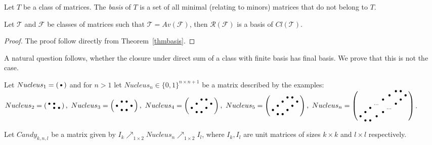 \begin{defn}
Let $T$ be a class of matrices. The \emph{basis} of $T$ is a set of all minimal (relating to minors) matrices that do not belong to $T$.
\end{defn}
\begin{cor}
Let $\mathcal{T}$ and $\mathcal{F}$ be classes of matrices such that $\mathcal{T}=Av(\mathcal{F})$, then $\mathcal{R}(\mathcal{F})$ is a basis of $Cl(\mathcal{T})$.
\end{cor}
\begin{proof}
The proof follow directly from Theorem~\ref{thmbasis}.
\end{proof}
A natural question follows, whether the closure under direct sum of a class with finite basis has final basis. We prove that this is not the case.

\begin{defn}
Let $Nucleus_1=\left(\begin{smallmatrix}\bullet\end{smallmatrix}\right)$ and for $n>1$ let $Nucleus_n\in\{0,1\}^{n\times n+1}$ be a matrix described by the examples:\\
$Nucleus_2=\left(\begin{smallmatrix}\bullet&\bullet& \\ &\bullet&\bullet\end{smallmatrix}\right),\ Nucleus_3=\left(\begin{smallmatrix} &\bullet&\bullet& \\\bullet& & &\bullet\\ &\bullet&\bullet& \end{smallmatrix}\right),\ Nucleus_4=\left(\begin{smallmatrix} & &\bullet&\bullet& \\ &\bullet& & &\bullet\\\bullet& & &\bullet& \\ &\bullet&\bullet& & \end{smallmatrix}\right),\\\ Nucleus_5=\left(\begin{smallmatrix} & & &\bullet&\bullet& \\ & &\bullet& & &\bullet\\ &\bullet& & &\bullet& \\\bullet& & &\bullet& & \\ &\bullet&\bullet& & & \end{smallmatrix}\right),\ Nucleus_n=\left(\begin{smallmatrix} & & & & & &\bullet&\bullet& \\ & & & & &\bullet& & &\bullet\\ & & & &\bullet& & &\bullet& \\ & & &\dots& & &\bullet& & \\ & &\bullet& & &\dots& & & \\ &\bullet& & &\bullet& & & & \\\bullet& & &\bullet& & & & & \\ &\bullet&\bullet& & & & & & \\\end{smallmatrix}\right)$.
\end{defn}
\begin{defn}
Let $Candy_{k,n,l}$ be a matrix given by $I_k\nearrow_{1\times2}Nucleus_n\nearrow_{1\times2}I_l$, where $I_k,I_l$ are unit matrices of sizes $k\times k$ and $l\times l$ respectively.
\end{defn}
